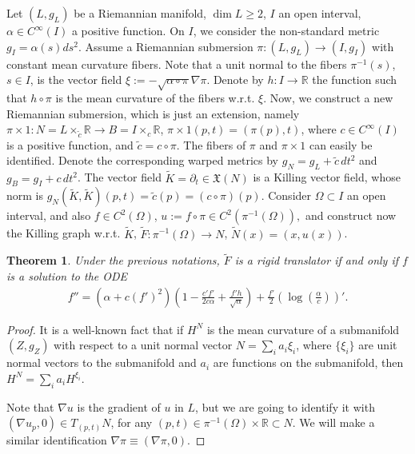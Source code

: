 \documentclass[12pt]{article}
\newtheorem{theorem}[lemma]{Theorem}
\numberwithin{lemma}{section}
\newcommand{\R}{\mathbb{R}}
\newcommand{\dt}{\partial_t}
\begin{document}
{Let $(L,g_L)$ be a Riemannian manifold, $\dim L\geq 2$, $I$ an open interval, $\alpha\in C^{\infty}(I)$ a positive function. On $I$, we consider the non-standard metric $g_I=\alpha(s)ds^2$. Assume a Riemannian submersion $\pi:(L,g_L)\rightarrow (I,g_I)$ with constant mean curvature fibers. Note that a unit normal to the fibers $\pi^{-1}(s)$, $s\in I$, is the vector field $\xi:=-\sqrt{\alpha\circ\pi}\nabla \pi$. Denote by $h:I\to\R$ the function such that $h\circ\pi$ is the mean curvature of the fibers w.r.t. $\xi$. Now, we construct a new Riemannian submersion, which is just an extension, namely $\pi\times 1:N=L\times_{\tilde{c}}\R \to B=I\times_c\R$, $\pi\times 1(p,t)=(\pi(p),t)$, 
where $c\in C^{\infty}(I)$ is a positive function, and $\tilde{c}=c\circ\pi$. The fibers of $\pi$ and $\pi\times 1$ can easily be identified. Denote the corresponding warped metrics by $g_N=g_L+\tilde{c}\,dt^2$ and $g_B=g_I+c\, dt^2$. The vector field $\tilde{K}=\dt\in\mathfrak{X}(N)$ is a Killing vector field, whose norm is $g_N(\tilde{K},\tilde{K})(p,t)=\tilde{c}(p)=(c\circ \pi)(p)$. Consider $\Omega\subset I$ an open interval, and also $f\in C^2(\Omega)$, $u:=f\circ\pi\in C^2(\pi^{-1}(\Omega)),$ and construct now the Killing graph w.r.t. $\tilde{K}$, $\tilde{F}:\pi^{-1}(\Omega)\rightarrow N$, $\tilde{N}(x)=(x,u(x))$. 


\begin{theorem}\label{submersions_and_Rigid_sol}
Under the previous notations, $\widetilde{F}$ is a rigid translator if and only if $f$ is a solution to the ODE
\begin{eqnarray}\label{ODE}
f''=\left(\alpha+c(f')^2\right)\left( 1-\frac{c'f'}{ 2c\alpha} +\frac{f'h}{\sqrt{\alpha}}\right) 
+\frac{f'}{2}\left(\log\left(\frac{\alpha}{c}\right)\right)'.
\end{eqnarray}
\end{theorem}
\begin{proof}  It is a well-known fact that if $H^N$ is the mean curvature of a submanifold $(Z,g_Z)$ with respect to a unit normal vector $N=\sum_ia_i\xi_i$, where $\{\xi_i\}$ are unit normal vectors to the submanifold  and $a_i$ are functions on the submanifold, then $H^N=\sum_i a_i H^{\xi_i}$. 

Note that $\nabla u$ is the gradient of $u$ in $L$, but we are going to identify it with $(\nabla u_p,0)\in T_{(p,t)}N$, for any $(p,t)\in\pi^{-1}(\Omega)\times\R\subset N$. We will make a similar identification $\nabla\pi\equiv(\nabla\pi,0)$. 



\end{proof}}
\end{document}
